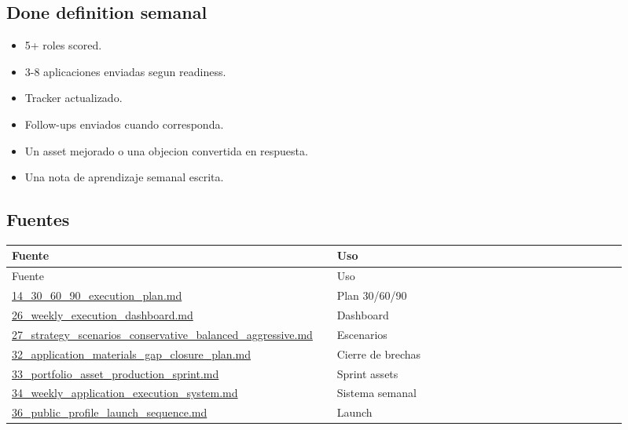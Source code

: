 \subsection{Done definition semanal}


\begin{itemize}
\item 5+ roles scored.
\item 3-8 aplicaciones enviadas segun readiness.
\item Tracker actualizado.
\item Follow-ups enviados cuando corresponda.
\item Un asset mejorado o una objecion convertida en respuesta.
\item Una nota de aprendizaje semanal escrita.
\end{itemize}


\subsection{Fuentes}


\begin{center}
\scriptsize
\begin{longtable}{>{\raggedright\arraybackslash}p{0.455\linewidth} >{\raggedright\arraybackslash}p{0.455\linewidth}}
\toprule
Fuente & Uso \\
\midrule
\endfirsthead
\toprule
Fuente & Uso \\
\midrule
\endhead
\href{file:///E:/Laboral/14_30_60_90_execution_plan.md}{14\_30\_60\_90\_execution\_plan.md} & Plan 30/60/90 \\
\href{file:///E:/Laboral/26_weekly_execution_dashboard.md}{26\_weekly\_execution\_dashboard.md} & Dashboard \\
\href{file:///E:/Laboral/27_strategy_scenarios_conservative_balanced_aggressive.md}{27\_strategy\_scenarios\_conservative\_balanced\_aggressive.md} & Escenarios \\
\href{file:///E:/Laboral/32_application_materials_gap_closure_plan.md}{32\_application\_materials\_gap\_closure\_plan.md} & Cierre de brechas \\
\href{file:///E:/Laboral/33_portfolio_asset_production_sprint.md}{33\_portfolio\_asset\_production\_sprint.md} & Sprint assets \\
\href{file:///E:/Laboral/34_weekly_application_execution_system.md}{34\_weekly\_application\_execution\_system.md} & Sistema semanal \\
\href{file:///E:/Laboral/36_public_profile_launch_sequence.md}{36\_public\_profile\_launch\_sequence.md} & Launch \\
\bottomrule
\end{longtable}
\end{center}
